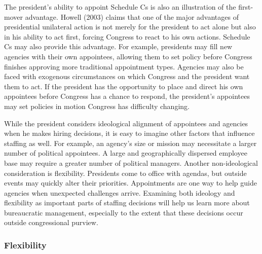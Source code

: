 \documentclass[12pt]{article}
\begin{document}
The president's ability to appoint Schedule Cs is also an illustration of the first-mover advantage. Howell (2003) claims that one of the major advantages of presidential unilateral action is not merely for the president to act alone but also in his ability to act first, forcing Congress to react to his own actions. Schedule Cs may also provide this advantage. For example, presidents may fill new agencies with their own appointees, allowing them to set policy before Congress finishes approving more traditional appointment types. Agencies may also be faced with exogenous circumstances on which Congress and the president want them to act. If the president has the opportunity to place and direct his own appointees before Congress has a chance to respond, the president's appointees may set policies in motion Congress has difficulty changing.
	
While the president considers ideological alignment of appointees and agencies when he makes hiring decisions, it is easy to imagine other factors that influence staffing as well. For example, an agency's size or mission may necessitate a larger number of political appointees. A large and geographically dispersed employee base may require a greater number of political managers. Another non-ideological consideration is flexibility. Presidents come to office with agendas, but outside events may quickly alter their priorities. Appointments are one way to help guide agencies when unexpected challenges arrive. Examining both ideology and flexibility as important parts of staffing decisions will help us learn more about bureaucratic management, especially to the extent that these decisions occur outside congressional purview. 
	
\subsubsection*{Flexibility}
\end{document}
